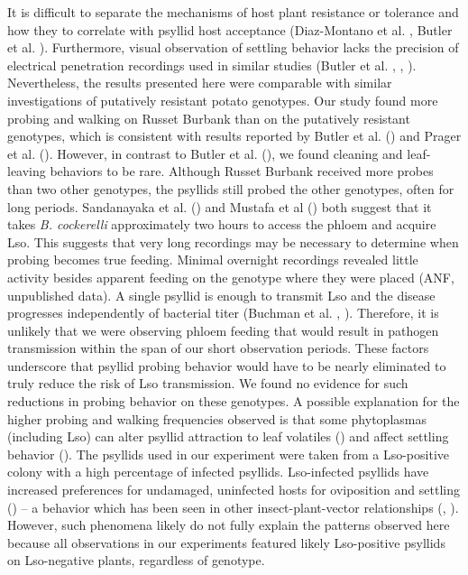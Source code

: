 \documentclass{UIdahoMastersThesis}
\begin{document}
It is difficult to separate the mechanisms of host plant resistance or tolerance and how they to correlate with psyllid host acceptance (Diaz-Montano et al. \citeyear{Diaz-Montano2006}, Butler et al. \citeyear{Butler2011}). Furthermore, visual observation of settling behavior lacks the precision of electrical penetration recordings used in similar studies (Butler et al. \citeyear{Butler2012b}, \cite{Mustafa2015b}, \cite{Sandanayaka2014}). Nevertheless, the results presented here were comparable with similar investigations of putatively resistant potato genotypes. Our study found more probing and walking on Russet Burbank than on the putatively resistant genotypes, which is consistent with results reported by Butler et al. (\citeyear{Butler2011}) and Prager et al. (\citeyear{Prager2014b}). However, in contrast to Butler et al. (\citeyear{Butler2011}), we found cleaning and leaf-leaving behaviors to be rare.
Although Russet Burbank received more probes than two other genotypes, the psyllids still probed the other genotypes, often for long periods. Sandanayaka et al. (\citeyear{Sandanayaka2014}) and Mustafa et al (\citeyear{Mustafa2015b}) both suggest that it takes \textit{B. cockerelli} approximately two hours to access the phloem and acquire Lso. This suggests that very long recordings may be necessary to determine when probing becomes true feeding. Minimal overnight recordings revealed little activity besides apparent feeding on the genotype where they were placed (ANF, unpublished data). A single psyllid is enough to transmit Lso and the disease progresses independently of bacterial titer (Buchman et al. \citeyear{Buchman2011a}, \cite{Rashed2012}). Therefore, it is unlikely that we were observing phloem feeding that would result in pathogen transmission within the span of our short observation periods. These factors underscore that psyllid probing behavior would have to be nearly eliminated to truly reduce the risk of Lso transmission. We found no evidence for such reductions in probing behavior on these genotypes.   
A possible explanation for the higher probing and walking frequencies observed is that some phytoplasmas (including Lso) can alter psyllid attraction to leaf volatiles (\cite{Mayer2008}) and affect settling behavior (\cite{Mas2014}). The psyllids used in our experiment were taken from a Lso-positive colony with a high percentage of infected psyllids. Lso-infected psyllids have increased preferences for undamaged, uninfected hosts for oviposition and settling (\cite{Davis2012}) – a behavior which has been seen in other insect-plant-vector relationships (\cite{Cao2016}, \cite{Eigenbrode2018}). However, such phenomena likely do not fully explain the patterns observed here because all observations in our experiments featured likely Lso-positive psyllids on Lso-negative plants, regardless of genotype.
\end{document}
